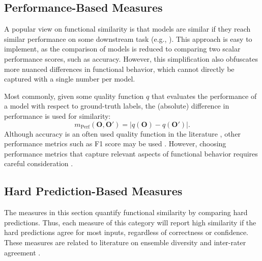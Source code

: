 \documentclass{article}
\newcommand{\Out}{\bm{O}}
\newcommand{\Outp}{\bm{O'}}
\begin{document}
\subsection{Performance-Based Measures}

A popular view on functional similarity is that models are similar if they reach similar performance on some downstream task (e.g., \cite{ding_grounding_2021,lenc_understanding_2015, csiszarik_similarity_2021, bansal_revisiting_2021}).
This approach is easy to implement, as the comparison of models is reduced to comparing two scalar performance scores, such as accuracy.
However, this simplification also obfuscates more nuanced differences in functional behavior, which cannot directly be captured with a single number per model.

Most commonly, given some quality function $q$ that evaluates the performance of a model with respect to ground-truth labels, the (absolute) difference in performance is used for similarity:
\begin{equation}
    m_{\operatorname{Perf}}(\Out, \Outp)= |q(\Out) - q(\Outp)|.
\end{equation}
Although accuracy is an often used quality function in the literature \cite{ding_grounding_2021,lenc_understanding_2015, csiszarik_similarity_2021, bansal_revisiting_2021}, other performance metrics such as F1 score may be used \cite{yadav_survey_2019}.
However, choosing performance metrics that capture relevant aspects of functional behavior requires careful consideration \cite{reinke_understanding_2023}.



\subsection{Hard Prediction-Based Measures}


The measures in this section quantify functional similarity by comparing hard predictions.
Thus, each measure of this category will report high similarity if the hard predictions agree for most inputs, regardless of correctness or confidence.
These measures are related to literature on ensemble diversity \cite{kuncheva_measures_2003, tang_analysis_2006} and inter-rater agreement \cite{banerjee_beyond_1999, tinsley_interrater_1975}.
\end{document}
